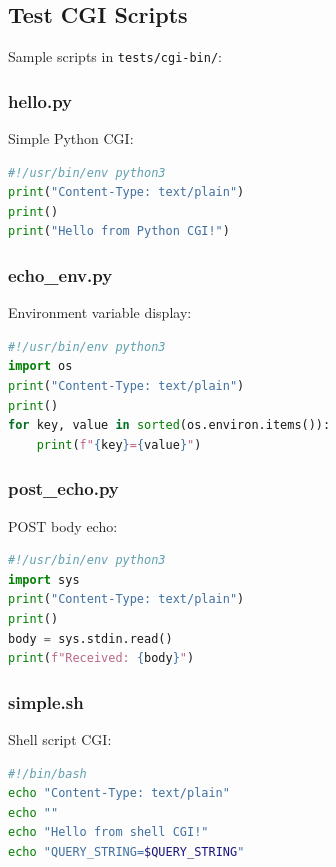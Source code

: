 \documentclass[11pt,a4paper]{article}
\begin{document}
\subsection{Test CGI Scripts}

Sample scripts in \texttt{tests/cgi-bin/}:

\subsubsection{hello.py}

Simple Python CGI:

\begin{lstlisting}[language=Python, caption=hello.py]
#!/usr/bin/env python3
print("Content-Type: text/plain")
print()
print("Hello from Python CGI!")
\end{lstlisting}

\subsubsection{echo\_env.py}

Environment variable display:

\begin{lstlisting}[language=Python, caption=echo\_env.py]
#!/usr/bin/env python3
import os
print("Content-Type: text/plain")
print()
for key, value in sorted(os.environ.items()):
    print(f"{key}={value}")
\end{lstlisting}

\subsubsection{post\_echo.py}

POST body echo:

\begin{lstlisting}[language=Python, caption=post\_echo.py]
#!/usr/bin/env python3
import sys
print("Content-Type: text/plain")
print()
body = sys.stdin.read()
print(f"Received: {body}")
\end{lstlisting}

\subsubsection{simple.sh}

Shell script CGI:

\begin{lstlisting}[language=bash, caption=simple.sh]
#!/bin/bash
echo "Content-Type: text/plain"
echo ""
echo "Hello from shell CGI!"
echo "QUERY_STRING=$QUERY_STRING"
\end{lstlisting}
\end{document}
